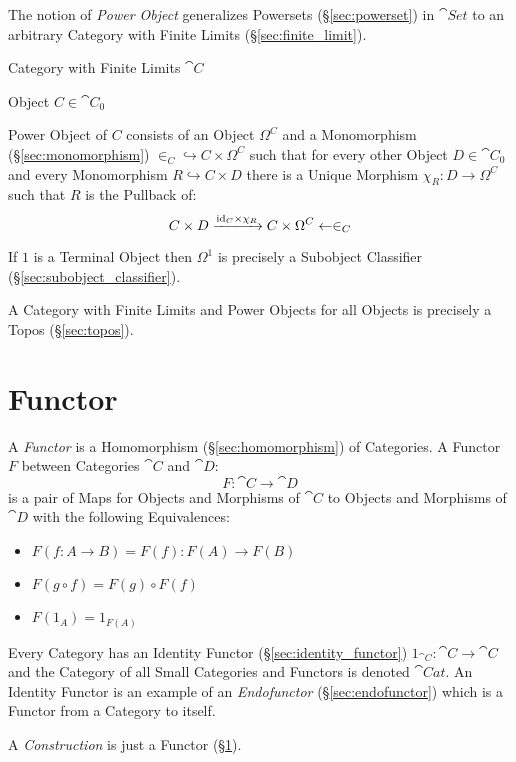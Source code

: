 The notion of \emph{Power Object} generalizes Powersets
(\S\ref{sec:powerset}) in $\cat{Set}$ to an arbitrary Category with
Finite Limits (\S\ref{sec:finite_limit}).

Category with Finite Limits $\cat{C}$

Object $C \in \cat{C}_0$

Power Object of $C$ consists of an Object $\Omega^C$ and a
Monomorphism (\S\ref{sec:monomorphism}) $\in_C \hookrightarrow C
\times \Omega^C$ such that for every other Object $D \in \cat{C}_0$
and every Monomorphism $R \hookrightarrow C \times D$ there is a
Unique Morphism $\chi_R : D \rightarrow \Omega^C$ such that $R$ is the
Pullback of:
\[
  C \times D \xrightarrow{\mathrm{id}_C \times \chi_R} C \times \Omega^C
    \leftarrow \in_C
\]

If $1$ is a Terminal Object then $\Omega^1$ is precisely a Subobject
Classifier (\S\ref{sec:subobject_classifier}).

A Category with Finite Limits and Power Objects for all Objects is
precisely a Topos (\S\ref{sec:topos}).



\section{Functor}\label{sec:functor}

A \emph{Functor} is a Homomorphism (\S\ref{sec:homomorphism}) of
Categories. A Functor $F$ between Categories $\cat{C}$ and $\cat{D}$:
\[
  F : \cat{C} \rightarrow \cat{D}
\]
is a pair of Maps for Objects and Morphisms of $\cat{C}$ to Objects
and Morphisms of $\cat{D}$ with the following Equivalences:
\begin{itemize}
\item $F(f : A \rightarrow B) = F(f) : F(A) \rightarrow F(B)$
\item $F(g \circ f) = F(g) \circ F(f)$
\item $F(1_A) = 1_{F(A)}$
\end{itemize}
Every Category has an Identity Functor (\S\ref{sec:identity_functor})
$1_{\cat{C}} : \cat{C} \rightarrow \cat{C}$ and the Category
of all Small Categories and Functors is denoted $\cat{Cat}$. An
Identity Functor is an example of an \emph{Endofunctor}
(\S\ref{sec:endofunctor}) which is a Functor from a Category to
itself.

A \emph{Construction} is just a Functor (\S\ref{sec:functor}).

